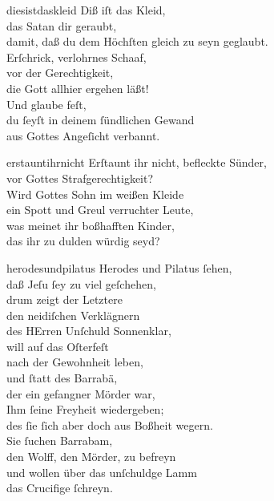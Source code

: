 \documentclass[tocstyle=ref-genre]{ees}
\begin{document}
{\begin{movement}{diesistdaskleid}
  Diß iſt das Kleid,\\
  das Satan dir geraubt,\\
  damit, daß du dem Höchſten gleich zu seyn geglaubt.\\
  Erſchrick, verlohrnes Schaaf,\\
  vor der Gerechtigkeit,\\
  die Gott allhier ergehen läßt!\\
  Und glaube feſt,\\
  du ſeyſt in deinem ſündlichen Gewand\\
  aus Gottes Angeſicht verbannt.
\end{movement}

\begin{movement}{erstauntihrnicht}
  Erſtaunt ihr nicht, befleckte Sünder,\\
  vor Gottes Strafgerechtigkeit?\\
  Wird Gottes Sohn im weißen Kleide\\
  ein Spott und Greul verruchter Leute,\\
  was meinet ihr boßhafften Kinder,\\
  das ihr zu dulden würdig seyd?
\end{movement}

\begin{movement}{herodesundpilatus}
  Herodes und Pilatus ſehen,\\
  daß Jeſu ſey zu viel geſchehen,\\
  drum zeigt der Letztere\\
  den neidiſchen Verklägnern\\
  des HErren Unſchuld Sonnenklar,\\
  will auf das Oſterfeſt\\
  nach der Gewohnheit leben,\\
  und ſtatt des Barrabä,\\
  der ein gefangner Mörder war,\\
  Ihm ſeine Freyheit wiedergeben;\\
  des ſie ſich aber doch aus Boßheit wegern.\\
  Sie ſuchen Barrabam,\\
  den Wolff, den Mörder, zu befreyn\\
  und wollen über das unſchuldge Lamm\\
  das Crucifige ſchreyn.
\end{movement}

}
\end{document}
